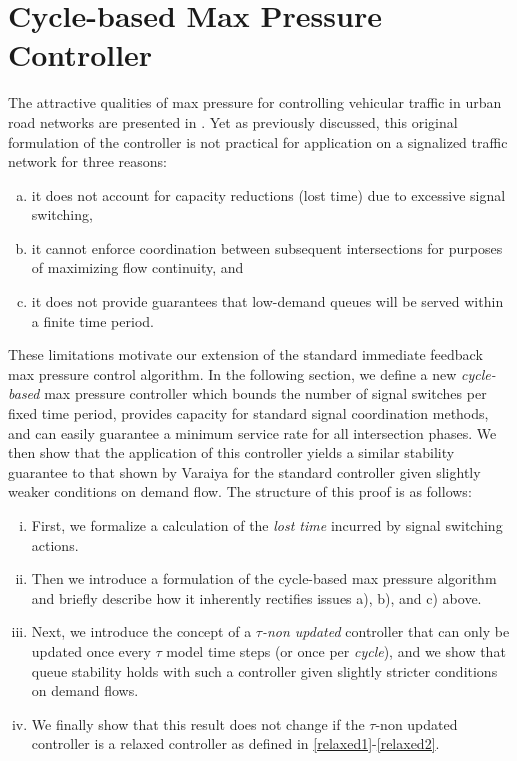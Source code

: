 \section{Cycle-based Max Pressure Controller} 




 



The attractive qualities of max pressure for controlling vehicular traffic in urban road networks are presented in \cite{MaxPressureStochastic}. Yet as previously discussed, this original formulation of the controller is not practical for application on a signalized traffic network for three reasons:
\begin{enumerate}[a)]
\item it does not account for capacity reductions (lost time) due to excessive signal switching, 
\item it cannot enforce coordination between subsequent intersections for purposes of maximizing flow continuity, and
\item it does not provide guarantees that low-demand queues will be served within a finite time period. 
\end{enumerate} 
These limitations motivate our extension of the standard immediate feedback max pressure control algorithm. In the following section, we define a new \emph{cycle-based} max pressure controller which bounds the number of signal switches per fixed time period, provides capacity for standard signal coordination methods, and can easily guarantee a minimum service rate for all intersection phases. We then show that the application of this controller yields a similar stability guarantee to that shown by Varaiya for the standard controller given slightly weaker conditions on demand flow. The structure of this proof is as follows: 
\begin{enumerate}[i.]
\item First, we formalize a calculation of the \emph{lost time} incurred by signal switching actions. 
\item Then we introduce a formulation of the cycle-based max pressure algorithm and briefly describe how it inherently rectifies issues a), b), and c) above. 
\item Next, we introduce the concept of a \emph{$\tau$-non updated} controller that can only be updated once every $\tau$ model time steps (or once per \emph{cycle}), and we show that queue stability holds with such a controller given slightly stricter conditions on demand flows. 
\item We finally show that this result does not change if the $\tau$-non updated controller is a relaxed controller as defined in \eqref{relaxed1}-\eqref{relaxed2}. 
\end{enumerate}
